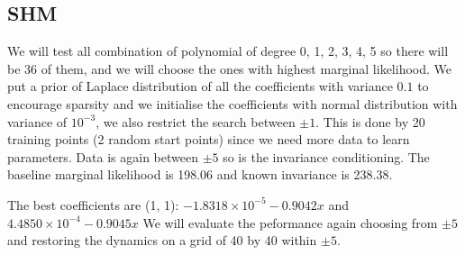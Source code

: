 \documentclass{statsmsc}
\begin{document}
\subsection{SHM}
We will test all combination of polynomial of degree 0, 1, 2, 3, 4, 5 so there will be 36 of them, and we will choose the ones with highest marginal likelihood.
We put a prior of Laplace distribution of all the coefficients with variance $0.1$ to encourage sparsity and we initialise the coefficients with normal distribution with variance of $10^{-3}$, we also restrict the search between $\pm 1$.
This is done by 20 training points (2 random start points) since we need more data to learn parameters.
Data is again between $\pm 5$ so is the invariance conditioning.
The baseline marginal likelihood is 198.06 and known invariance is 238.38.
\begin{flushleft}
\begin{table}[H]
  \caption{Log marginal likelihood for polynomial of different degree}
  \label{tab:shm_paramertised}
\end{table}
\end{flushleft}
The best coefficients are (1, 1):
$-1.8318\times 10^{-5}-0.9042x$
and
$4.4850\times 10^{-4}-0.9045x$
We will evaluate the peformance again choosing from $\pm 5$ and restoring the dynamics on a grid of 40 by 40 within $\pm 5$.
\end{document}
